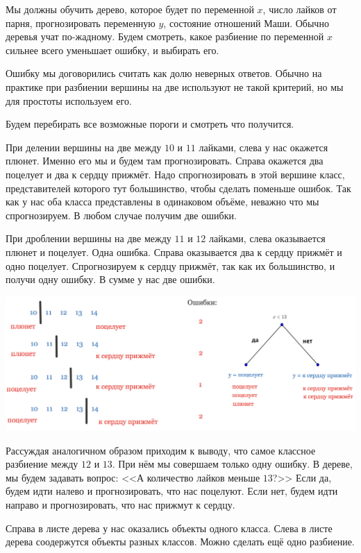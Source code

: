 \documentclass[12pt, a4paper, oneside]{article}
\theoremstyle{plain} %
\theoremstyle{definition}
\begin{document}
\begin{solution}
Мы должны обучить дерево, которое будет по переменной $x$, число лайков от парня, прогнозировать переменную $y$, состояние отношений Маши.  Обычно деревья учат по-жадному. Будем смотреть, какое разбиение по переменной $x$ сильнее всего уменьшает ошибку, и выбирать его. 
	
Ошибку мы договорились считать как долю неверных ответов. Обычно на практике при разбиении вершины на две используют не такой критерий, но мы для простоты используем его.

Будем перебирать все возможные пороги и смотреть что получится.
	
При делении вершины на две между $10$ и $11$ лайками, слева у нас окажется плюнет. Именно его мы и будем там прогнозировать. Справа окажется два поцелует и два к сердцу прижмёт. Надо спрогнозировать в этой вершине класс, представителей которого тут большинство, чтобы сделать поменьше ошибок. Так как у нас оба класса представлены в одинаковом объёме, неважно что мы спрогнозируем. В любом случае получим две ошибки. 
	
При дроблении вершины на две между $11$ и $12$ лайками, слева оказывается плюнет и поцелует. Одна ошибка. Справа оказывается два к сердцу прижмёт и одно поцелует. Спрогнозируем к сердцу прижмёт, так как их большинство, и получи одну ошибку. В сумме у нас две ошибки. 
	
\begin{center}
    \includegraphics[scale=0.28]{class_tree_1.png}
\end{center} 	
	
Рассуждая аналогичном образом приходим к выводу, что самое классное разбиение между $12$ и $13$. При нём мы совершаем только одну ошибку.  В дереве, мы будем задавать вопрос: <<А количество лайков меньше $13$?>> Если да, будем идти налево и прогнозировать, что нас поцелуют. Если нет, будем идти направо и прогнозировать, что нас прижмут к сердцу. 
	
Справа в листе дерева у нас оказались объекты одного класса. Слева в листе дерева соодержутся объекты разных классов. Можно сделать ещё одно разбиение. 
	

\end{solution}
\end{document}
